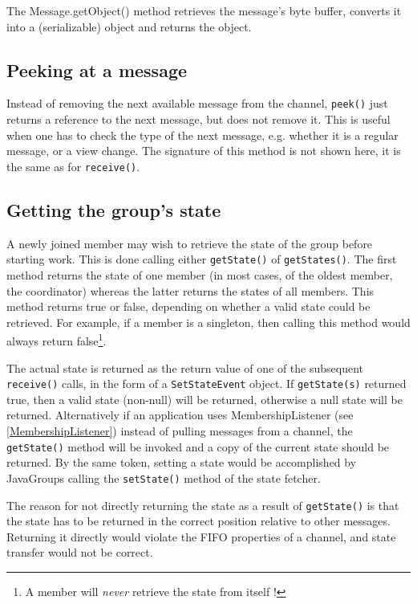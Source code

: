     The Message.getObject() method retrieves the message's byte buffer, converts it
    into a (serializable) object and returns the object.


    \subsection{Peeking at a message}

    Instead of removing the next available message from the channel, {\tt peek()}
    just returns a reference to the next message, but does not remove it. This is
    useful when one has to check the type of the next message, e.g. whether it is a
    regular message, or a view change. The signature of this method is not shown
    here, it is the same as for {\tt receive()}.



    \subsection{Getting the group's state} \label{GetState}

    A newly joined member may wish to retrieve the state of the group before starting
    work. This is done calling either {\tt getState()} of {\tt getStates()}. The
    first method returns the state of one member (in most cases, of the oldest
    member, the coordinator) whereas the latter returns the states of all
    members. This method returns true or false, depending on whether a valid state
    could be retrieved. For example, if a member is a singleton, then calling this
    method would always return false\footnote{A member will {\em never} retrieve the
    state from itself !}.

    The actual state is returned as the return value of one of the subsequent {\tt
    receive()} calls, in the form of a {\tt SetStateEvent} object. If {\tt getState(s)}
    returned true, then a valid state (non-null) will be returned, otherwise a null
    state will be returned. Alternatively if an application uses MembershipListener
    (see \ref{MembershipListener}) instead of pulling messages from a channel, the
    {\tt getState()} method will be invoked and a copy of the current state should
    be returned. By the same token, setting a state would be accomplished by
    JavaGroups calling the {\tt setState()} method of the state fetcher.
    
    The reason for not directly returning the state as a result of {\tt getState()} is
    that the state has to be returned in the correct position relative to other
    messages. Returning it directly would violate the FIFO properties of a channel,
    and state transfer would not be correct.

